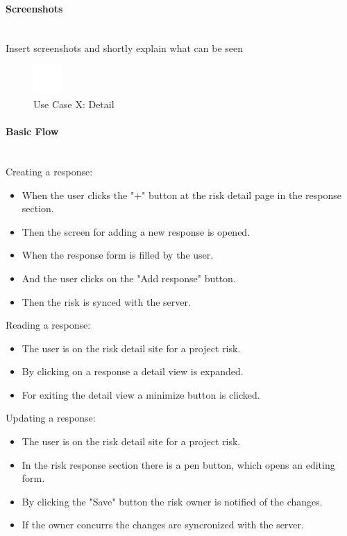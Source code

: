 \paragraph*{Screenshots}\mbox{}\\
Insert screenshots and shortly explain what can be seen
\begin{figure}[h] 
	\centering
	\includegraphics[width=0.1\textwidth]{Content/Domain/placeholder.png}
	\caption{Use Case X: Detail}
	\label{fig:label8}
\end{figure}

\paragraph*{Basic Flow} \mbox{}\\
\noindent
Creating a response:
\begin{itemize}
	\vspace{-3mm}
	\setlength\itemsep{-1.5em}
	\item When the user clicks the "+" button at the risk detail page in the response section.
	\item Then the screen for adding a new response is opened.
	\item When the response form is filled by the user.
	\item And the user clicks on the "Add response" button.
	\item Then the risk is synced with the server.
\end{itemize}

\noindent
Reading a response:
\begin{itemize}
	\vspace{-3mm}
	\setlength\itemsep{-1em}
	\item The user is on the risk detail site for a project risk.
	\item By clicking on a response a detail view is expanded.
	\item For exiting the detail view a minimize button is clicked.
\end{itemize}

\noindent
Updating a response: 
\begin{itemize}
	\vspace{-3mm}
	\setlength\itemsep{-1em}
	\item The user is on the risk detail site for a project risk.
	\item In the risk response section there is a pen button, which opens an editing form.
	\item By clicking the "Save" button the risk owner is notified of the changes.
	\item If the owner concurrs the changes are syncronized with the server.
\end{itemize} 

